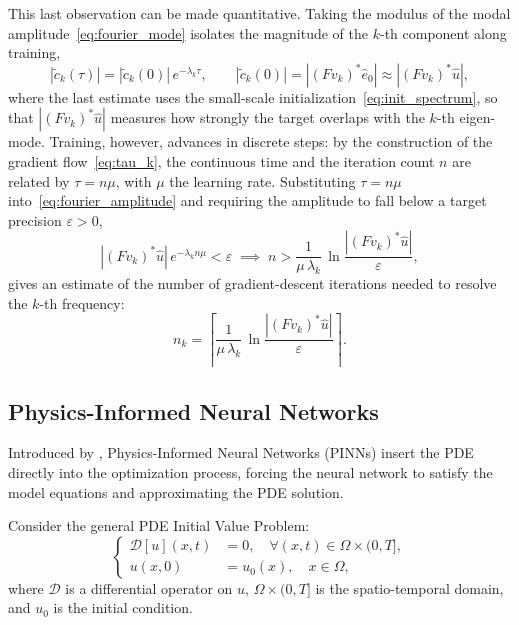 This last observation can be made quantitative. Taking the modulus of the modal amplitude~\eqref{eq:fourier_mode} isolates the magnitude of the $k$-th component along training,
\begin{equation}\label{eq:fourier_amplitude}
    |\tilde c_k(\tau)| = |\tilde c_k(0)|\,e^{-\lambda_k\tau},
    \qquad
    |\tilde c_k(0)| = |(F v_k)^{*}\hat e_0| \approx |(F v_k)^{*}\hat u|,
\end{equation}
where the last estimate uses the small-scale initialization~\eqref{eq:init_spectrum}, so that $|(F v_k)^{*}\hat u|$ measures how strongly the target overlaps with the $k$-th eigen-mode. Training, however, advances in discrete steps: by the construction of the gradient flow~\eqref{eq:tau_k}, the continuous time and the iteration count $n$ are related by $\tau = n\mu$, with $\mu$ the learning rate. Substituting $\tau = n\mu$ into~\eqref{eq:fourier_amplitude} and requiring the amplitude to fall below a target precision $\varepsilon > 0$,
\begin{equation}\label{eq:iteration_bound}
    |(F v_k)^{*}\hat u|\,e^{-\lambda_k n\mu} < \varepsilon
    \;\implies\;
    n > \frac{1}{\mu\,\lambda_k}\,\ln\frac{|(F v_k)^{*}\hat u|}{\varepsilon},
\end{equation}
gives an estimate of the number of gradient-descent iterations needed to resolve the $k$-th frequency:
\begin{equation}\label{eq:iteration_count}
    n_k = \left\lceil \frac{1}{\mu\,\lambda_k}\,\ln\frac{|(F v_k)^{*}\hat u|}{\varepsilon}\right\rceil.
\end{equation}

\subsection{Physics-Informed Neural Networks}
\label{subsec:pinn}

Introduced by \textcite{raissi2017}, Physics-Informed Neural Networks (PINNs) insert the PDE directly into the optimization process, forcing the neural network to satisfy the model equations and approximating the PDE solution.

Consider the general PDE Initial Value Problem:
\begin{equation}\label{eq:generic_pde}
    \left\{
    \begin{aligned}
        \mathcal{D}[u](x,t) &= 0, \quad \forall (x,t) \in \Omega \times (0,T], \\
        u(x,0)              &= u_0(x), \quad x \in \Omega,
    \end{aligned}
    \right.
\end{equation}
\noindent where $\mathcal{D}$ is a differential operator on $u$, $\Omega \times (0,T]$ is the spatio-temporal domain, and $u_0$ is the initial condition.

